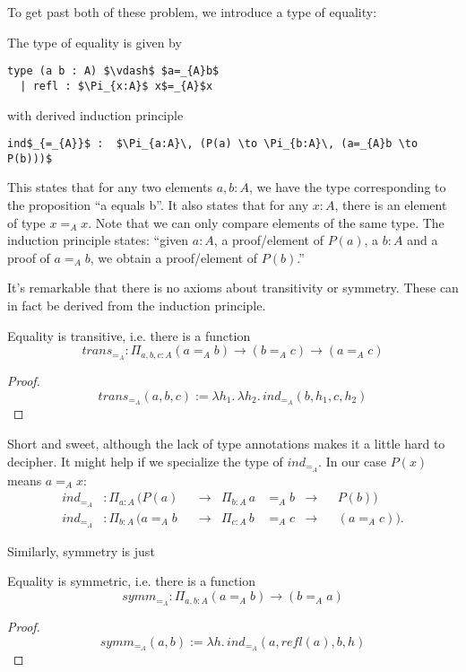 \documentclass[a4paper, 12pt]{article}
\newcommand{\la}[1]{\lambda{#1}.\,}
\theoremstyle{changedot}
\theoremstyle{changedotbreak}
\theoremstyle{nonumberplain}
\newtheorem{proof}{Proof}
\begin{document}
To get past both of these problem, we introduce a type of equality:
\begin{definition}
  The type of equality is given by
\begin{lstlisting}[mathescape=true]
  type (a b : A) $\vdash$ $a=_{A}b$
  | refl : $\Pi_{x:A}$ x$=_{A}$x
\end{lstlisting}
  with derived induction principle  
\begin{lstlisting}
ind$_{=_{A}}$ :  $\Pi_{a:A}\, (P(a) \to \Pi_{b:A}\, (a=_{A}b \to P(b)))$
\end{lstlisting}
\end{definition}

This states that for any two elements $a, b : A$, we have the type corresponding to the proposition ``a equals b''. It also states that for any $x : A$, there is an element of type $x=_{A}x$. Note that we can only compare elements of the same type. The induction principle states: ``given $a:A$, a proof/element of $P(a)$, a $b:A$ and a proof of $a=_{A}b$, we obtain a proof/element of $P(b)$.''

It's remarkable that there is no axioms about transitivity or symmetry. These can in fact be derived from the induction principle.
\begin{theorem}
  Equality is transitive, i.e. there is a function
  \[trans_{=_{A}} : \Pi_{a, b, c : A} (a=_{A}b) \to (b=_{A}c) \to (a=_{A}c) \]
\end{theorem}
\begin{proof}
  \[trans_{=_{A}}(a, b, c) := \la{h_{1}} \la{h_{2}} ind_{=_{A}}(b, h_{1}, c, h_{2})\]
\end{proof}
Short and sweet, although the lack of type annotations makes it a little hard to decipher. It might help if we specialize the type of $ind_{=_{A}}$. In our case $P(x)$ means $a=_{A}x$:
\begin{align*}
  ind_{=_{A}} &: \Pi_{a:A}\, (P(a)& &\to& \Pi_{b:A}\, a&=_{A}b &\to& &P(b)) \\
  ind_{=_{A}} &: \Pi_{b:A}\, (a=_{A}b& &\to& \Pi_{c:A}\, b&=_{A}c &\to& &(a=_{A}c)).
\end{align*}

Similarly, symmetry is just
\begin{theorem}
  Equality is symmetric, i.e. there is a function
  \[symm_{=_{A}} : \Pi_{a, b : A} (a =_{A} b) \to (b =_{A} a) \]
\end{theorem}
\begin{proof}
  \[symm_{=_{A}}(a, b) := \la h ind_{=_{A}}(a, refl(a), b, h)\]
\end{proof}
\end{document}
